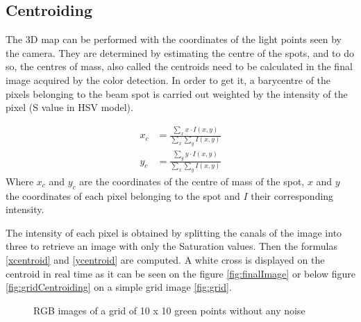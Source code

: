 \subsection{Centroiding}
\label{centroiding}

The 3D map can be performed with the coordinates of the light points seen by the camera. They are determined by estimating the centre of the spots, and to do so, the centres of mass, also called the centroids need to be calculated in the final image acquired by the color detection. In order to get it, a barycentre of the pixels belonging to the beam spot is carried out weighted by the intensity of the pixel (S value in HSV model).

\begin{align}
x_c &= \frac{\sum_x x \cdot I(x,y)}{\sum_x \sum_y I(x,y)} \label{xcentroid} \\
y_c &= \frac{\sum_y y \cdot I(x,y)}{\sum_x \sum_y I(x,y)} \label{ycentroid}
\end{align}
Where $x_c$ and $y_c$ are the coordinates of the centre of mass of the spot, $x$ and $y$ the coordinates of each pixel belonging to the spot and $I$ their corresponding intensity.

The intensity of each pixel is obtained by splitting the canals of the image into three to retrieve an image with only the Saturation values. Then the formulas \eqref{xcentroid} and \eqref{ycentroid} are computed. A white cross is displayed on the centroid in real time as it can be seen on the figure \ref{fig:finalImage} or below figure \ref{fig:gridCentroiding} on a simple grid image \ref{fig:grid}.

\begin{figure}[!h] 
\centering
{}
\quad 
{}
\caption{RGB images of a grid of 10 x 10 green points without any noise} 
\end{figure}

